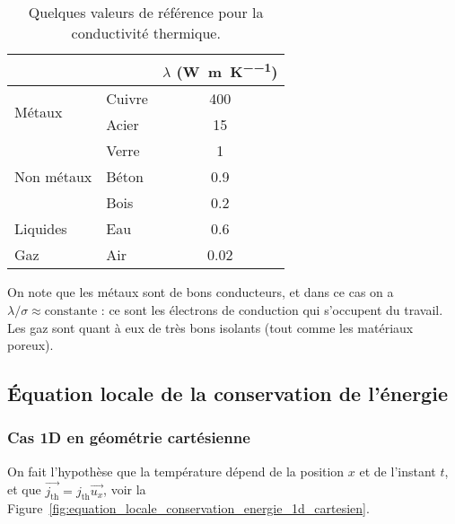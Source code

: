         \begin{table}
            \centering
            \begin{tabular}{l|l|c}
                \toprule
                & & $\lambda$ (\si[]{\watt\per\metre\per\kelvin})\\ \midrule
                \multirow{2}{*}{Métaux}
                & Cuivre & 400\\
                & Acier & 15\\ \midrule
                \multirow{3}{*}{Non métaux}
                & Verre & 1\\
                & Béton & 0.9\\
                & Bois & 0.2\\ \midrule
                Liquides & Eau & 0.6\\ \midrule
                Gaz & Air & 0.02\\ \bottomrule
            \end{tabular}    
            \caption{Quelques valeurs de référence pour la conductivité thermique.}
            \label{tab:odg_conductivite_thermique}
        \end{table}

        On note que les métaux sont de bons conducteurs, et dans ce cas on a $\lambda/\sigma\approx\text{constante}$ : ce sont les électrons de conduction qui s'occupent du travail. Les gaz sont quant à eux de très bons isolants (tout comme les matériaux poreux).

    \subsection{Équation locale de la conservation de l'énergie}
        \subsubsection{Cas 1D en géométrie cartésienne}

            On fait l'hypothèse que la température dépend de la position $x$ et de l'instant $t$, et que $\vec{j_{\text{th}}}=j_{\text{th}}\vec{u_x}$, voir la Figure~\ref{fig:equation_locale_conservation_energie_1d_cartesien}.

